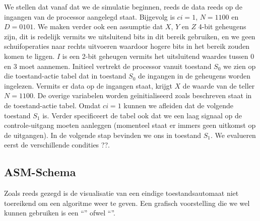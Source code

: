 We stellen dat vanaf dat we de simulatie beginnen, reeds de data reeds op de ingangen van de processor aangelegd staat. Bijgevolg is $ci=1$, $N=1100$ en $D=0101$. We maken verder ook een assumptie dat $X$, $Y$ en $Z$ 4-bit geheugens zijn, dit is redelijk vermits we uitsluitend bits in dit bereik gebruiken, en we geen schuifoperaties naar rechts uitvoeren waardoor hogere bits in het bereik zouden komen te liggen. $I$ is een 2-bit geheugen vermits het uitsluitend waardes tussen 0 en 3 moet aannemen. Initieel vertrekt de processor vanuit toestand $S_0$ we zien op die toestand-actie tabel dat in toestand $S_0$ de ingangen in de geheugens worden ingelezen. Vermits er data op de ingangen staat, krijgt $X$ de waarde van de teller $N=1100$. De overige variabelen worden ge\"initialiseerd zoals beschreven staat in de toestand-actie tabel. Omdat $ci=1$ kunnen we afleiden dat de volgende toestand $S_1$ is. Verder specificeert de tabel ook dat we een laag signaal op de controle-uitgang moeten aanleggen (momenteel staat
er immers geen uitkomst op de uitgangen). In de volgende stap bevinden we ons in toestand $S_1$. We evalueren eerst de verschillende condities ??.
\subsection{ASM-Schema}
Zoals reeds gezegd is de visualisatie van een eindige toestandsautomaat niet toereikend om een algoritme weer te geven. Een grafisch voorstelling die we wel kunnen gebruiken is een ``'' ofwel ``''.
